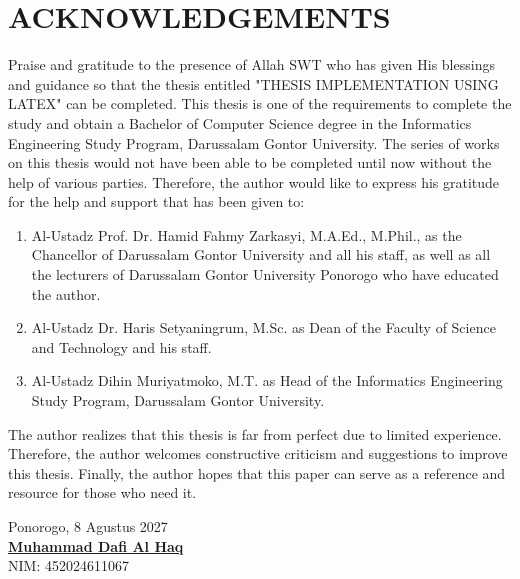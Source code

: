 \chapter*{ACKNOWLEDGEMENTS}

Praise and gratitude to the presence of Allah SWT who has given His blessings and guidance so that the thesis entitled "THESIS IMPLEMENTATION USING LATEX" can be completed. This thesis is one of the requirements to complete the study and obtain a Bachelor of Computer Science degree in the Informatics Engineering Study Program, Darussalam Gontor University. The series of works on this thesis would not have been able to be completed until now without the help of various parties. Therefore, the author would like to express his gratitude for the help and support that has been given to:

\begin{enumerate}
	\item Al-Ustadz Prof. Dr. Hamid Fahmy Zarkasyi, M.A.Ed., M.Phil., as the Chancellor of Darussalam Gontor University and all his staff, as well as all the lecturers of Darussalam Gontor University Ponorogo who have educated the author.
	\item Al-Ustadz Dr. Haris Setyaningrum, M.Sc. as Dean of the Faculty of Science and Technology and his staff.
	\item Al-Ustadz Dihin Muriyatmoko, M.T. as Head of the Informatics Engineering Study Program, Darussalam Gontor University.
\end{enumerate}

The author realizes that this thesis is far from perfect due to limited experience. Therefore, the author welcomes constructive criticism and suggestions to improve this thesis. Finally, the author hopes that this paper can serve as a reference and resource for those who need it.\\

\begin{flushright}
	\begin{minipage}{5cm} 
		Ponorogo, 8 Agustus 2027
		\vspace{3cm}\\
		\centering\textbf{\underline{Muhammad Dafi Al Haq}}\\
		\centering NIM: 452024611067\\
	\end{minipage}
\end{flushright}